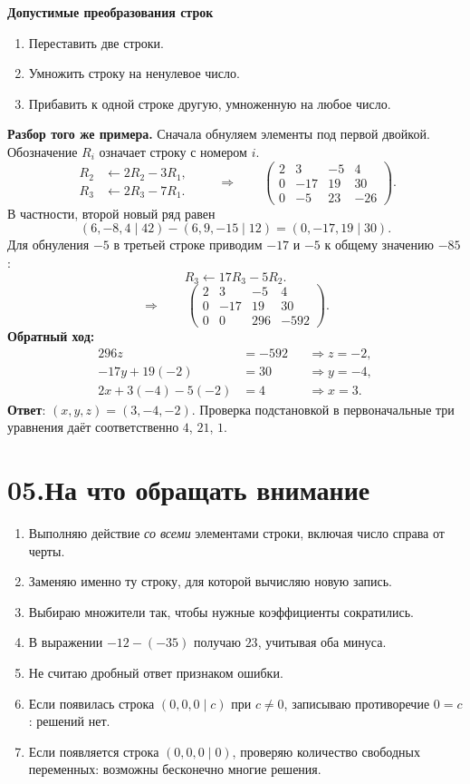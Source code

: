 \documentclass[a4paper,12pt]{article}
\newcommand{\strong}[1]{{\color{darkaccent}\textbf{#1}}}
\newcommand{\task}[1]{\item #1}
\begin{document}
\textbf{Допустимые преобразования строк}
\begin{enumerate}[label=\arabic*.,itemsep=0.25em]
\task Переставить две строки.
\task Умножить строку на ненулевое число.
\task Прибавить к одной строке другую, умноженную на любое число.
\end{enumerate}

\textbf{Разбор того же примера.} Сначала обнуляем элементы под
первой двойкой. Обозначение $R_i$ означает строку с номером $i$.
\[
\begin{aligned}
R_2&\leftarrow 2R_2-3R_1,\\
R_3&\leftarrow 2R_3-7R_1.
\end{aligned}
\qquad\Rightarrow\qquad
\left(
\begin{array}{rrr|r}
2&3&-5&4\\
0&-17&19&30\\
0&-5&23&-26
\end{array}
\right).
\]
В частности, второй новый ряд равен
\[
(6,-8,4\mid42)-(6,9,-15\mid12)
=(0,-17,19\mid30).
\]
Для обнуления $-5$ в третьей строке приводим $-17$ и $-5$
к общему значению $-85$:
\[
R_3\leftarrow 17R_3-5R_2.
\]
\[
\Rightarrow\qquad
\left(
\begin{array}{rrr|r}
2&3&-5&4\\
0&-17&19&30\\
0&0&296&-592
\end{array}
\right).
\]
\textbf{Обратный ход:}
\[
\begin{aligned}
296z&=-592 &&\Rightarrow z=-2,\\
-17y+19(-2)&=30 &&\Rightarrow y=-4,\\
2x+3(-4)-5(-2)&=4 &&\Rightarrow x=3.
\end{aligned}
\]
\strong{Ответ}: $(x,y,z)=(3,-4,-2)$.
Проверка подстановкой в первоначальные три уравнения даёт
соответственно $4$, $21$, $1$.

\section*{\color{darkaccent}05.\quad На что обращать внимание}
\begin{enumerate}[label=$\square$,leftmargin=11mm,itemsep=0.35em]
\task Выполняю действие \emph{со всеми} элементами строки,
включая число справа от черты.
\task Заменяю именно ту строку, для которой вычисляю новую запись.
\task Выбираю множители так, чтобы нужные коэффициенты сократились.
\task В выражении $-12-(-35)$ получаю $23$, учитывая оба минуса.
\task Не считаю дробный ответ признаком ошибки.
\task Если появилась строка $(0,0,0\mid c)$ при $c\ne0$,
записываю противоречие $0=c$: решений нет.
\task Если появляется строка $(0,0,0\mid0)$,
проверяю количество свободных переменных: возможны бесконечно многие решения.
\end{enumerate}
\end{document}

